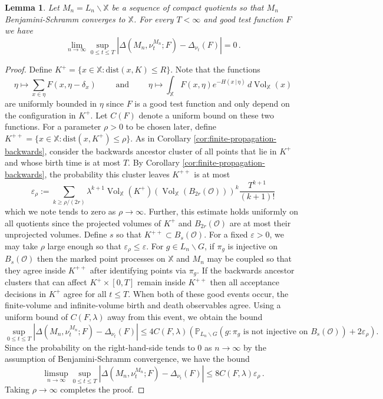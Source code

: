 \documentclass[11pt]{amsart}
\newtheorem{lemma}[theorem]{Lemma}
\theoremstyle{definition}
\theoremstyle{remark}
\newcommand{\bX}{\mathbb{X}}
\newcommand{\Vol}{\operatorname{Vol}}
\newcommand{\dist}{\mathrm{dist}}
\newcommand{\eps}{\varepsilon}
\renewcommand{\P}{\mathbb{P}}
\begin{document}
\begin{lemma}\label{lem:finite-propagation}
    Let $M_n = L_n \backslash \bX$ be a sequence of compact quotients so that $M_n$ Benjamini-Schramm converges to $\bX$.  For every $T < \infty$ and good test function $F$ we have $$\lim_{n\to\infty} \sup_{0 \leq t \leq T} \left|\Delta\left(M_n, \nu_t^{M_n};F\right) - \Delta_{\nu_t}(F)\right| = 0 \,.$$    
\end{lemma}
\begin{proof}
	Define $K^+ = \{x \in \bX: \dist(x,K) \leq R\}$.  Note that the functions \begin{equation*}
        \eta \mapsto \sum_{x \in \eta} F(x,\eta - \delta_x) \qquad \text{ and } \qquad  \eta \mapsto \int_{\bX} F(x,\eta) e^{-H(x\,|\,\eta)} \,d\Vol_{\bX}(x)
    \end{equation*}
    are uniformly bounded in $\eta$ since $F$ is a good test function and only depend on the configuration in $K^+$.  Let $C(F)$ denote a uniform bound on these two functions.  For a parameter $\rho > 0$ to be chosen later, define $K^{++} = \{x \in \bX: \dist(x,K^+) \leq \rho\}$.  As in Corollary \ref{cor:finite-propagation-backwards}, consider the backwards ancestor cluster of all points that lie in $K^+$ and whose birth time is at most $T$.  By Corollary \ref{cor:finite-propagation-backwards}, the probability this cluster leaves $K^{++}$ is at most \begin{equation}
    	\eps_\rho := \sum_{k \geq \rho / (2r)} \lambda^{k+1} \Vol_\bX(K^+)  (\Vol_{\bX}(B_{2r}(\mathcal{O})))^k \frac{T^{k+1}}{(k+1)!} 
    \end{equation}
which we note tends to zero as $\rho \to \infty$.  Further, this estimate holds uniformly on all quotients since the projected volumes of $K^+$ and $B_{2r}(\mathcal{O})$ are at most their unprojected volumes.  Define $s$ so that $K^{++} \subset B_s(\mathcal{O})$.    For a fixed $\eps > 0$, we may take $\rho$ large enough so that $\eps_\rho \leq \eps$.  For $g \in L_n \backslash G$,  if $\pi_g$ is injective on $B_s(\mathcal{O})$ then the marked point processes on $\bX$ and $M_n$ may be coupled so that they agree inside $K^{++}$ after identifying points via $\pi_g$.  If the backwards ancestor clusters that can affect $K^+ \times [0,T]$ remain inside $K^{++}$ then all acceptance decisions in $K^+$ agree for all $t \leq T$.  When both of these good events occur, the finite-volume and infinite-volume birth and death observables agree. 
Using a uniform bound of $C(F,\lambda)$ away from this event, we obtain the bound \begin{equation*}
	\sup_{0 \leq t \leq T} \left|\Delta\left(M_n, \nu_t^{M_n};F\right) - \Delta_{\nu_t}(F)\right|\leq 4 C(F,\lambda)\left( \P_{L_n \backslash G}(g : \pi_g \text{ is not injective on } B_s(\mathcal{O})) + 2\eps_\rho \right).
\end{equation*}
    Since the probability on the right-hand-side tends to $0$ as $n \to \infty$ by the assumption of Benjamini-Schramm convergence, we have the bound $$\limsup_{n \to \infty} \sup_{0 \leq t \leq T} \left|\Delta\left(M_n, \nu_t^{M_n};F\right) - \Delta_{\nu_t}(F)\right| \leq 8 C(F,\lambda) \eps_\rho\,.$$ 
	Taking $\rho \to \infty$ completes the proof.
\end{proof}
\end{document}
